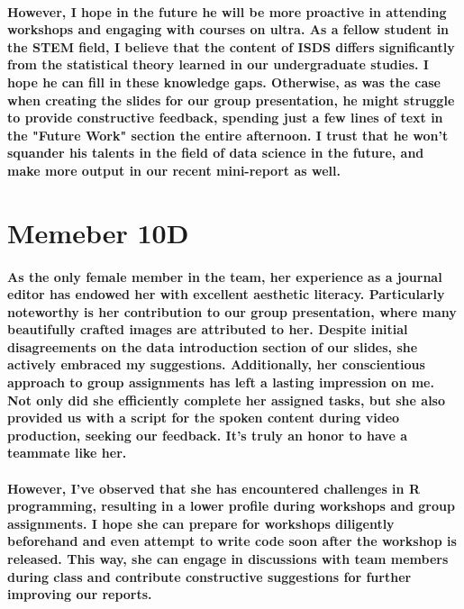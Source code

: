 \documentclass[11pt]{article} %
\begin{document}
\paragraph{However, I hope in the future he will be more proactive in attending workshops and engaging with courses on ultra. As a fellow student in the STEM field, I believe that the content of ISDS differs significantly from the statistical theory learned in our undergraduate studies. I hope he can fill in these knowledge gaps. Otherwise, as was the case when creating the slides for our group presentation, he might struggle to provide constructive feedback, spending just a few lines of text in the "Future Work" section the entire afternoon. I trust that he won't squander his talents in the field of data science in the future, and make more output in our recent mini-report as well.}
% 
\section{Memeber 10D}
% 
\paragraph{As the only female member in the team, her experience as a journal editor has endowed her with excellent aesthetic literacy. Particularly noteworthy is her contribution to our group presentation, where many beautifully crafted images are attributed to her. Despite initial disagreements on the data introduction section of our slides, she actively embraced my suggestions. Additionally, her conscientious approach to group assignments has left a lasting impression on me. Not only did she efficiently complete her assigned tasks, but she also provided us with a script for the spoken content during video production, seeking our feedback. It's truly an honor to have a teammate like her.}
% 
\paragraph{However, I've observed that she has encountered challenges in R programming, resulting in a lower profile during workshops and group assignments. I hope she can prepare for workshops diligently beforehand and even attempt to write code soon after the workshop is released. This way, she can engage in discussions with team members during class and contribute constructive suggestions for further improving our reports.}
% 
% 
% 
% 
% 
% 
% 
% 
% 
% 
% 
% 
\end{document}
